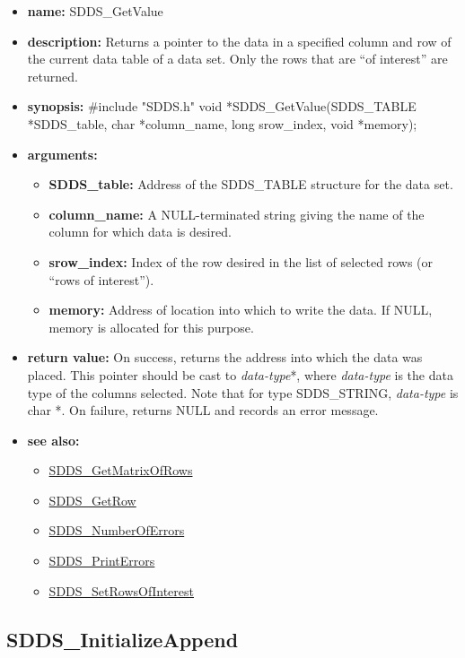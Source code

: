 \documentclass[11pt]{article}
\newcommand{\progref}[1]{\hyperref{SDDS_#1}{{\tt SDDS\_#1} (}{)}{SDDS_#1}}
\begin{document}
\begin{itemize}
\item {\bf name:}\newline
SDDS\_GetValue
\item {\bf description:}\newline
Returns a pointer to the data in a specified column and row of the current data table of a data set. Only the rows that are ``of interest'' are returned.
\item {\bf synopsis:} \#include "SDDS.h"\newline
void *SDDS\_GetValue(SDDS\_TABLE *SDDS\_table, char *column\_name, long srow\_index, void *memory);
\item {\bf arguments:}
\begin{itemize}
\item {\bf SDDS\_table:} Address of the SDDS\_TABLE structure for the data set.
\item {\bf column\_name:} A NULL-terminated string giving the name of the column for which data is desired.
\item {\bf srow\_index:} Index of the row desired in the list of selected rows (or ``rows of interest'').
\item {\bf memory:} Address of location into which to write the data. If NULL, memory is allocated for this purpose.
\end{itemize}
\item {\bf return value:}\newline
On success, returns the address into which the data was placed. This pointer should be cast to {\em data-type}*, where {\em data-type} is the data type of the columns selected. Note that for type SDDS\_STRING, {\em data-type} is char *.\newline
\newline
On failure, returns NULL and records an error message. 
\item {\bf see also:}
\begin{itemize}
\item \progref{GetMatrixOfRows}
\item \progref{GetRow}
\item \progref{NumberOfErrors}
\item \progref{PrintErrors}
\item \progref{SetRowsOfInterest}
\end{itemize}
\end{itemize}

\subsection{SDDS\_InitializeAppend}
\label{SDDS_InitializeAppend}
\end{document}
